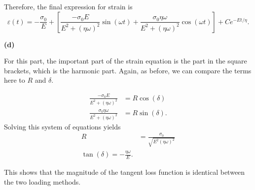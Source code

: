  Therefore, the final expression for strain is
 \begin{equation*}
     \varepsilon(t) = -\frac{\sigma_0}{E} + \left[ \frac{-\sigma_0 E}{E^2 + (\eta \omega)^2} \sin(\omega t) + \frac{\sigma_0 \eta \omega}{E^2 + (\eta \omega)^2} \cos(\omega t) \right] + Ce^{-Et/\eta}.
 \end{equation*}

 \textbf{(d)}
 
 For this part, the important part of the strain equation is the part in the square brackets, which is the harmonic part. Again, as before, we can compare the terms here to $R$ and $\delta$.

 \begin{align*}
     \frac{-\sigma_0 E}{E^2 + (\eta \omega)^2} &= R\cos(\delta)\\
     \frac{\sigma_0 \eta \omega}{E^2 + (\eta \omega)^2} &= R\sin(\delta).
 \end{align*}
 Solving this system of equations yields
 \begin{align*}
     R &= \frac{\sigma_0}{\sqrt{E^2 (\eta \omega)^2}}\\
     \tan (\delta) = -\frac{\eta \omega}{E}.
 \end{align*}

 This shows that the magnitude of the tangent loss function is identical between the two loading methods.
 

